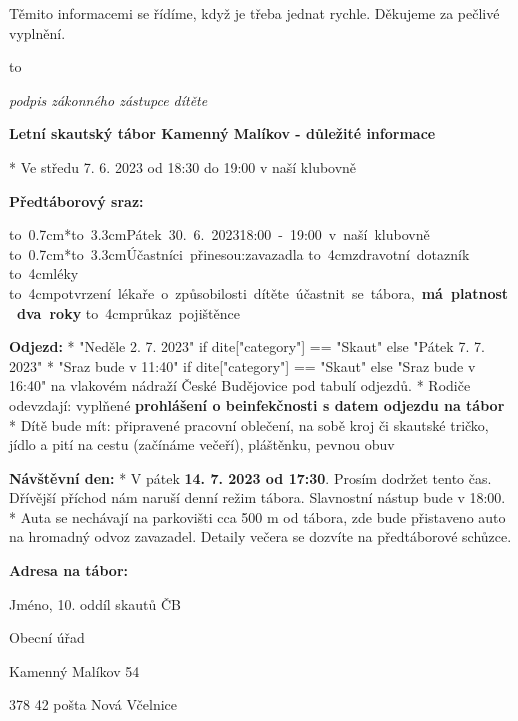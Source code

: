 Těmito informacemi se řídíme, když je třeba jednat rychle. Děkujeme za pečlivé vyplnění.
\smallskip

\hbox to 

{\hfill\it\typosize[7/13]podpis zákonného zástupce dítěte}

\vfil\break

\centerline{\typosize[14/13]\bf Letní skautský tábor Kamenný Malíkov - důležité informace}
\bigskip


\begitems
* Ve středu 7. 6. 2023 od 18:30 do 19:00 v naší klubovně
\enditems

{\bf Předtáborový sraz:}

\begitems
\hbox{\hbox to 0.7cm{}*\hbox to 3.3cm{Pátek 30. 6. 2023\hfil}18:00 - 19:00 v naší klubovně}
\hbox{\hbox to 0.7cm{}*\hbox to 3.3cm{Účastníci přinesou:\hfil}zavazadla}
\hbox{\hbox to 4cm{\hfil}zdravotní dotazník}
\hbox{\hbox to 4cm{\hfil}léky}
\hbox{\hbox to 4cm{\hfil}potvrzení lékaře o způsobilosti dítěte účastnit se tábora, \bf má platnost dva roky}
\hbox{\hbox to 4cm{\hfil}průkaz pojištěnce}
\enditems

{\bf Odjezd:}
\begitems
* {{ "Neděle 2. 7. 2023" if dite["category"] == "Skaut" else "Pátek 7. 7. 2023" }}
* {{"Sraz bude v 11:40" if dite["category"] == "Skaut" else "Sraz bude v 16:40"}} na vlakovém nádraží České Budějovice pod tabulí odjezdů.
* Rodiče odevzdají: vyplňené {\bf prohlášení o beinfekčnosti s datem odjezdu na tábor}
* Dítě bude mít: připravené pracovní oblečení, na sobě kroj či skautské tričko, jídlo a pití na cestu (začínáme večeří), pláštěnku, pevnou obuv
\enditems

{\bf Návštěvní den:}
\begitems
* V pátek {\bf 14. 7. 2023 od 17:30}. Prosím dodržet tento čas. Dřívější příchod nám naruší denní režim tábora. Slavnostní nástup bude v 18:00. 
* Auta se nechávají na parkovišti cca 500 m od tábora, zde bude přistaveno auto na hromadný odvoz zavazadel. Detaily večera se dozvíte na předtáborové schůzce.
\enditems

{\bf Adresa na tábor:}

\parindent=4cm

Jméno, 10. oddíl skautů ČB

Obecní úřad

Kamenný Malíkov 54

378 42 pošta Nová Včelnice

